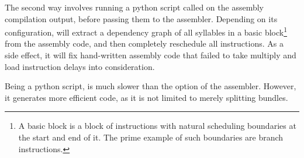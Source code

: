 The second way involves running a python script called  on the 
assembly compilation output, before passing them to the assembler. Depending on 
its configuration,  will extract a dependency graph of all 
syllables in a basic block\footnote{A basic block is a block of instructions 
with natural scheduling boundaries at the start and end of it. The prime example 
of such boundaries are branch instructions.} from the assembly code, and then 
completely reschedule all instructions. As a side effect, it will fix 
hand-written assembly code that failed to take multiply and load instruction 
delays into consideration.

Being a python script,  is much slower than the 
 option of the assembler. However, it generates more efficient 
code, as it is not limited to merely splitting bundles.
